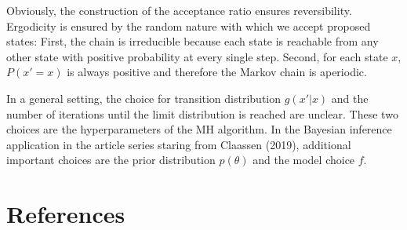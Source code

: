 \documentclass[12pt,english,a4paper,oneside]{article}
\theoremstyle{definition}
\theoremstyle{definition}
\theoremstyle{definition}
\theoremstyle{definition}
\theoremstyle{remark}
\begin{document}
\noindent
Obviously, the construction of the acceptance ratio ensures reversibility. Ergodicity is ensured by the random nature with which we accept proposed states: First, the chain is irreducible because each state is reachable from any other state with positive probability at every single step. Second, for each state \(x\), \(P(x'=x)\) is always positive and therefore the Markov chain is aperiodic.

In a general setting, the choice for transition distribution \(g(x'|x)\) and the number of iterations until the limit distribution is reached are unclear. These two choices are the hyperparameters of the MH algorithm. In the Bayesian inference application in the article series staring from Claassen (2019), additional important choices are the prior distribution \(p(\theta)\) and the model choice \(f\).

\newpage

\hypertarget{references}{%
\section*{References}\label{references}}

\singlespacing
\end{document}

